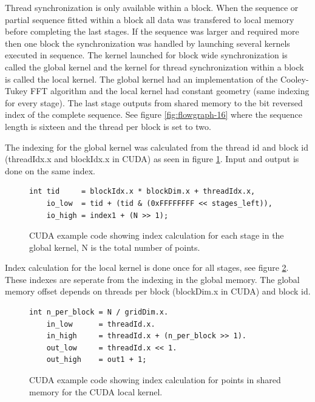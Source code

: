Thread synchronization is only available within a block. When the sequence or partial sequence fitted within a block all data was transfered to local memory before completing the last stages. If the sequence was larger and required more then one block the synchronization was handled by launching several kernels executed in sequence. The kernel launched for block wide synchronization is called the global kernel and the kernel for thread synchronization within a block is called the local kernel. The global kernel had an implementation of the Cooley-Tukey FFT algorithm and the local kernel had constant geometry (same indexing for every stage). The last stage outputs from shared memory to the bit reversed index of the complete sequence. See figure \ref{fig:flowgraph-16} where the sequence length is sixteen and the thread per block is set to two.

The indexing for the global kernel was calculated from the thread id and block id (threadIdx.x and blockIdx.x in CUDA) as seen in figure \ref{fig:code-global-index}. Input and output is done on the same index.
\begin{figure}
	\centering
	\lstset{language=C++}
	\begin{framed}
	\begin{lstlisting}
int tid     = blockIdx.x * blockDim.x + threadIdx.x,
    io_low  = tid + (tid & (0xFFFFFFFF << stages_left)),
    io_high = index1 + (N >> 1);
	\end{lstlisting}
	\end{framed}
	\caption{ CUDA example code showing index calculation for each stage in the global kernel, N is the total number of points. }
	\label{fig:code-global-index}
\end{figure}

Index calculation for the local kernel is done once for all stages, see figure \ref{fig:code-local-index}. These indexes are seperate from the indexing in the global memory. The global memory offset depends on threads per block (blockDim.x in CUDA) and block id.
\begin{figure}
	\centering
	\lstset{language=C++}
	\begin{framed}
	\begin{lstlisting}
int n_per_block = N / gridDim.x.
    in_low      = threadId.x.
    in_high     = threadId.x + (n_per_block >> 1).
    out_low     = threadId.x << 1.
    out_high    = out1 + 1;
	\end{lstlisting}
	\end{framed}
	\caption{ CUDA example code showing index calculation for points in shared memory for the CUDA local kernel. }
	\label{fig:code-local-index}
\end{figure}

